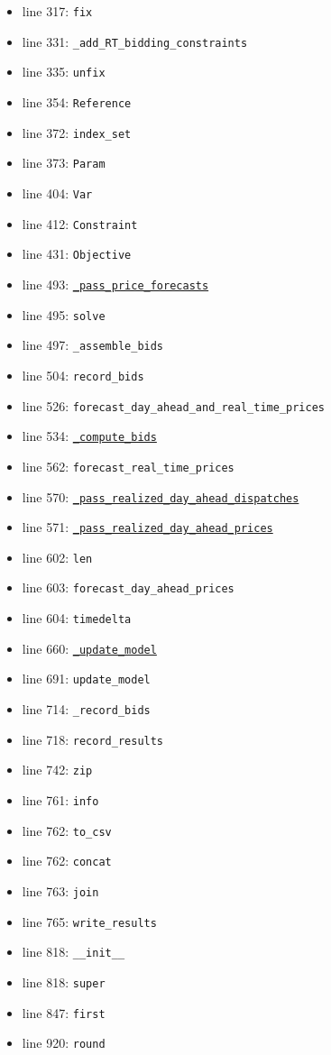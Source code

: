 \documentclass[11pt]{report}
\begin{document}
\begin{itemize}[leftmargin=*]
  \item line 317: \texttt{fix}
  \item line 331: \texttt{\_add\_RT\_bidding\_constraints}
  \item line 335: \texttt{unfix}
  \item line 354: \texttt{Reference}
  \item line 372: \texttt{index\_set}
  \item line 373: \texttt{Param}
  \item line 404: \texttt{Var}
  \item line 412: \texttt{Constraint}
  \item line 431: \texttt{Objective}
  \item line 493: \hyperref[def:bidder.py:StochasticProgramBidder._pass_price_forecasts:L724]{\texttt{\_pass\_price\_forecasts}}
  \item line 495: \texttt{solve}
  \item line 497: \texttt{\_assemble\_bids}
  \item line 504: \texttt{record\_bids}
  \item line 526: \texttt{forecast\_day\_ahead\_and\_real\_time\_prices}
  \item line 534: \hyperref[def:bidder.py:StochasticProgramBidder._compute_bids:L456]{\texttt{\_compute\_bids}}
  \item line 562: \texttt{forecast\_real\_time\_prices}
  \item line 570: \hyperref[def:bidder.py:StochasticProgramBidder._pass_realized_day_ahead_dispatches:L622]{\texttt{\_pass\_realized\_day\_ahead\_dispatches}}
  \item line 571: \hyperref[def:bidder.py:StochasticProgramBidder._pass_realized_day_ahead_prices:L584]{\texttt{\_pass\_realized\_day\_ahead\_prices}}
  \item line 602: \texttt{len}
  \item line 603: \texttt{forecast\_day\_ahead\_prices}
  \item line 604: \texttt{timedelta}
  \item line 660: \hyperref[def:bidder.py:StochasticProgramBidder._update_model:L675]{\texttt{\_update\_model}}
  \item line 691: \texttt{update\_model}
  \item line 714: \texttt{\_record\_bids}
  \item line 718: \texttt{record\_results}
  \item line 742: \texttt{zip}
  \item line 761: \texttt{info}
  \item line 762: \texttt{to\_csv}
  \item line 762: \texttt{concat}
  \item line 763: \texttt{join}
  \item line 765: \texttt{write\_results}
  \item line 818: \texttt{\_\_init\_\_}
  \item line 818: \texttt{super}
  \item line 847: \texttt{first}
  \item line 920: \texttt{round}
\end{itemize}
\end{document}
